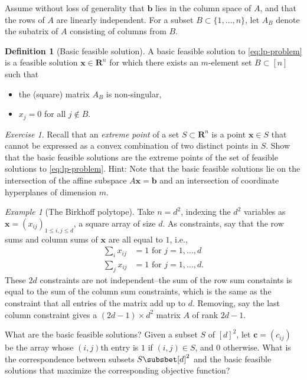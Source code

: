 \documentclass{amsbook}
\newcommand{\xx}{\mathbf x}
\newcommand{\cc}{\mathbf c}
\newcommand{\bb}{\mathbf b}
\newcommand{\RR}{\mathbf R}
\theoremstyle{definition}
\newtheorem{definition}[theorem]{Definition}
\theoremstyle{remark}
\newtheorem{example}[theorem]{Example}
\newtheorem{exercise}[theorem]{Exercise}
\begin{document}
Assume without loss of generality that $\bb$ lies in the column space of $A$, and that the rows of $A$ are linearly independent.
For a subset $B\subset \{1,\dotsc,n\}$, let $A_B$ denote the subatrix of $A$ consisting of columns from $B$.
\begin{definition}
  [Basic feasible solution]
  A basic feasible solution to \eqref{eq:lp-problem} is a feasible solution $\xx\in \RR^n$ for which there exists an $m$-element set $B\subset [n]$ such that
  \begin{itemize}
  \item the (square) matrix $A_B$ is non-singular,
  \item $x_j=0$ for all $j\notin B$.
  \end{itemize}
\end{definition}
\begin{exercise}
  Recall that an \emph{extreme point} of a set $S\subset \RR^n$ is a point $\xx\in S$ that cannot be expressed as a convex combination of two distinct points in $S$.
  Show that the basic feasible solutions are the extreme points of the set of feasible solutions to \eqref{eq:lp-problem}.
  Hint: Note that the basic feasible solutions lie on the intersection of the affine subspace $A\xx=\bb$ and an intersection of coordinate hyperplanes of dimension $m$.
\end{exercise}
\begin{example}[The Birkhoff polytope]
  Take $n=d^2$, indexing the $d^2$ variables as $\xx=(x_{ij})_{1\leq i,j\leq d}$, a square array of size $d$.
  As constraints, say that the row sums and column sums of $\xx$ are all equal to $1$, i.e.,
  \begin{align*}
    \sum_i x_{ij} &= 1 \text{ for } j=1,\dotsc,d\\
    \sum_j x_{ij} &= 1 \text{ for } j=1,\dotsc,d.
  \end{align*}
  These $2d$ constraints are not independent--the sum of the row sum constaints is equal to the sum of the column sum constraints, which is the same as the constraint that all entries of the matrix add up to $d$.
  Removing, say the last column constraint gives a $(2d-1)\times d^2$ matrix $A$ of rank $2d-1$.

  What are the basic feasible solutions?
  Given a subset $S$ of $[d]^2$, let $\cc=(c_{ij})$ be the array whose $(i,j)$th entry is $1$ if $(i,j)\in S$, and $0$ otherwise.
  What is the correspondence between subsets $S\subsbet [d]^2$ and the basic feasible solutions that maximize the corresponding objective function?
\end{example}
\end{document}
